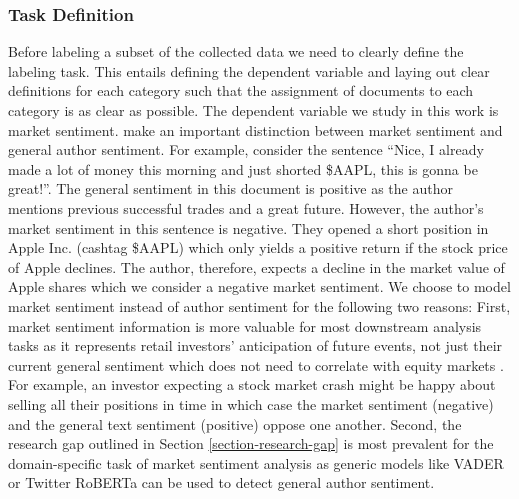 \subsubsection{Task Definition}
Before labeling a subset of the collected data we need to clearly define the labeling task. This entails defining the dependent variable and laying out clear definitions for each category such that the assignment of documents to each category is as clear as possible. The dependent variable we study in this work is market sentiment.  make an important distinction between market sentiment and general author sentiment. For example, consider the sentence ``Nice, I already made a lot of money this morning and just shorted \$AAPL, this is gonna be great!''. The general sentiment in this document is positive as the author mentions previous successful trades and a great future. However, the author's market sentiment in this sentence is negative. They opened a short position in Apple Inc. (cashtag \$AAPL) which only yields a positive return if the stock price of Apple declines. The author, therefore, expects a decline in the market value of Apple shares which we consider a negative market sentiment. We choose to model market sentiment instead of author sentiment for the following two reasons: First, market sentiment information is more valuable for most downstream analysis tasks as it represents retail investors' anticipation of future events, not just their current general sentiment which does not need to correlate with equity markets \cite{chen2020finsome}. For example, an investor expecting a stock market crash might be happy about selling all their positions in time in which case the market sentiment (negative) and the general text sentiment (positive) oppose one another.
 Second, the research gap outlined in Section \ref{section-research-gap} is most prevalent for the domain-specific task of market sentiment analysis as generic models like VADER \cite{hutto2014vader} or Twitter RoBERTa \cite{barbieri2020tweeteval} can be used to detect general author sentiment.

